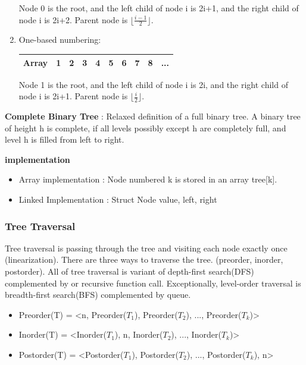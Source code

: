 \begin{section}
\begin{enumerate}
    \bigskip\noindent
    Node 0 is the root, and the left child of node i is 2i+1, and the right child of node i is 2i+2. Parent node is $\lfloor \frac{i-1}{2} \rfloor$.
    \item One-based numbering: \\
    \begin{tabular}{|c|c|c|c|c|c|c|c|c|c|}
        \hline
        \textbf{Array} & 1 & 2 & 3 & 4 & 5 & 6 & 7 & 8 & ... \\
        \hline
    \end{tabular}

    \bigskip\noindent
    Node 1 is the root, and the left child of node i is 2i, and the right child of node i is 2i+1. Parent node is $\lfloor \frac{i}{2} \rfloor$.
\end{enumerate}

\noindent\textbf{Complete Binary Tree} : Relaxed definition of a full binary tree. A binary tree of height h is complete, if all levels possibly except h are completely full, and level h is filled from left to right.

\bigskip\noindent
\textbf{implementation}
\begin{itemize}
    \item Array implementation : Node numbered k is stored in an array tree[k].
    \item Linked Implementation : Struct Node {value, left, right}
\end{itemize}

\subsubsection*{Tree Traversal}

Tree traversal is passing through the tree and visiting each node exactly once (linearization). There are three ways to traverse the tree. (preorder, inorder, postorder). All of tree traversal is variant of depth-first search(DFS) complemented by  or recursive function call. Exceptionally, level-order traversal is breadth-first search(BFS) complemented by queue.
\begin{itemize}
    \item Preorder(T) = \textless n, Preorder($T_1$), Preorder($T_2$), ..., Preorder($T_k$)\textgreater
    \item Inorder(T) = \textless Inorder($T_1$), n, Inorder($T_2$), ..., Inorder($T_k$)\textgreater
    \item Postorder(T) = \textless Postorder($T_1$), Postorder($T_2$), ..., Postorder($T_k$), n\textgreater
\end{itemize}


\end{section}
